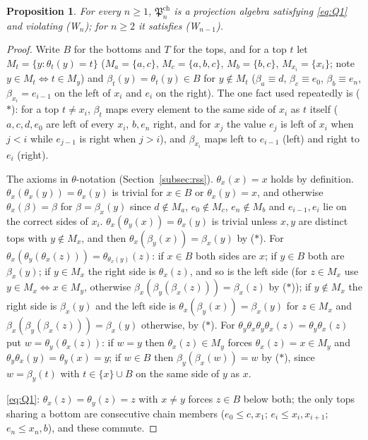 \documentclass[11pt]{amsart}
\newtheorem{proposition}[theorem]{Proposition}
\theoremstyle{definition}
\newcommand{\Wn}[1][n]{\textup{(W$_{#1}$)}}
\begin{document}
\begin{proposition}\label{prop:chainwit}
For every $n\ge1$, $\mathfrak P^{\mathrm{ch}}_n$ is a projection algebra satisfying \eqref{eq:Q1} and violating \Wn; for $n\ge2$ it satisfies \Wn[n-1].
\end{proposition}

\begin{proof}
Write $B$ for the bottoms and $T$ for the tops, and for a top $t$ let $M_t=\{y:\theta_t(y)=t\}$ ($M_a=\{a,c\}$, $M_c=\{a,b,c\}$, $M_b=\{b,c\}$, $M_{x_i}=\{x_i\}$; note $y\in M_t\Leftrightarrow t\in M_y$) and $\beta_t(y)=\theta_t(y)\in B$ for $y\notin M_t$ ($\beta_a\equiv d$, $\beta_c\equiv e_0$, $\beta_b\equiv e_n$, $\beta_{x_i}=e_{i-1}$ on the left of $x_i$ and $e_i$ on the right). The one fact used repeatedly is ($*$): for a top $t\ne x_i$, $\beta_t$ maps every element to the same side of $x_i$ as $t$ itself ($a,c,d,e_0$ are left of every $x_i$, $b,e_n$ right, and for $x_j$ the value $e_j$ is left of $x_i$ when $j<i$ while $e_{j-1}$ is right when $j>i$), and $\beta_{x_i}$ maps left to $e_{i-1}$ (left) and right to $e_i$ (right).

The axioms in $\theta$-notation (Section~\ref{subsec:rss}). $\theta_x(x)=x$ holds by definition. $\theta_x(\theta_x(y))=\theta_x(y)$ is trivial for $x\in B$ or $\theta_x(y)=x$, and otherwise $\theta_x(\beta)=\beta$ for $\beta=\beta_x(y)$ since $d\notin M_a$, $e_0\notin M_c$, $e_n\notin M_b$ and $e_{i-1},e_i$ lie on the correct sides of $x_i$. $\theta_x(\theta_y(x))=\theta_x(y)$ is trivial unless $x,y$ are distinct tops with $y\notin M_x$, and then $\theta_x(\beta_y(x))=\beta_x(y)$ by ($*$). For $\theta_x(\theta_y(\theta_x(z)))=\theta_{\theta_x(y)}(z)$: if $x\in B$ both sides are $x$; if $y\in B$ both are $\beta_x(y)$; if $y\in M_x$ the right side is $\theta_x(z)$, and so is the left side (for $z\in M_x$ use $y\in M_x\Leftrightarrow x\in M_y$, otherwise $\beta_x(\beta_y(\beta_x(z)))=\beta_x(z)$ by ($*$)); if $y\notin M_x$ the right side is $\beta_x(y)$ and the left side is $\theta_x(\beta_y(x))=\beta_x(y)$ for $z\in M_x$ and $\beta_x(\beta_y(\beta_x(z)))=\beta_x(y)$ otherwise, by ($*$). For $\theta_y\theta_x\theta_y\theta_x(z)=\theta_y\theta_x(z)$ put $w=\theta_y(\theta_x(z))$: if $w=y$ then $\theta_x(z)\in M_y$ forces $\theta_x(z)=x\in M_y$ and $\theta_y\theta_x(y)=\theta_y(x)=y$; if $w\in B$ then $\beta_y(\beta_x(w))=w$ by ($*$), since $w=\beta_y(t)$ with $t\in\{x\}\cup B$ on the same side of $y$ as $x$.

\eqref{eq:Q1}: $\theta_x(z)=\theta_y(z)=z$ with $x\ne y$ forces $z\in B$ below both; the only tops sharing a bottom are consecutive chain members ($e_0\le c,x_1$; $e_i\le x_i,x_{i+1}$; $e_n\le x_n,b$), and these commute.


\end{proof}
\end{document}
